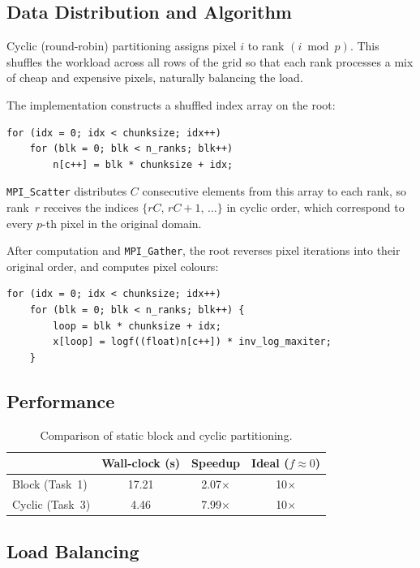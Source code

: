 \documentclass[11pt,a4paper]{article}
\begin{document}
\subsection{Data Distribution and Algorithm}

Cyclic (round-robin) partitioning assigns pixel $i$ to rank $(i \bmod p)$.
This shuffles the workload across all rows of the grid so that each rank
processes a mix of cheap and expensive pixels, naturally balancing the load.

The implementation constructs a shuffled index array on the root:
\begin{lstlisting}
for (idx = 0; idx < chunksize; idx++)
    for (blk = 0; blk < n_ranks; blk++)
        n[c++] = blk * chunksize + idx;
\end{lstlisting}
\texttt{MPI\_Scatter} distributes $C$ consecutive elements from this array
to each rank, so rank~$r$ receives the indices
$\{r C,\, r C{+}1,\, \ldots\}$ in cyclic order, which correspond
to every $p$-th pixel in the original domain.

After computation and \texttt{MPI\_Gather}, the root reverses pixel iterations 
into their original order, and computes pixel colours:
\begin{lstlisting}
for (idx = 0; idx < chunksize; idx++)
    for (blk = 0; blk < n_ranks; blk++) {
        loop = blk * chunksize + idx;
        x[loop] = logf((float)n[c++]) * inv_log_maxiter;
    }
\end{lstlisting}

\subsection{Performance}

\begin{table}[h]\centering
\begin{tabular}{@{}lccc@{}}
\toprule
 & Wall-clock (s) & Speedup & Ideal ($f{\approx}0$) \\
\midrule
Block  (Task~1) & 17.21 & 2.07$\times$ & 10$\times$ \\
Cyclic (Task~3) &  4.46 & 7.99$\times$ & 10$\times$ \\
\bottomrule
\end{tabular}
\caption{Comparison of static block and cyclic partitioning.}
\label{tab:task3}
\end{table}

\subsection{Load Balancing}
\end{document}
